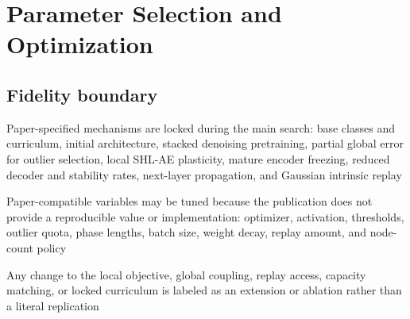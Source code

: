 \section{Parameter Selection and Optimization}

\subsection{Fidelity boundary}
\begin{draftpoints}
  \item Paper-specified mechanisms are locked during the main search: base classes and curriculum, initial architecture, stacked denoising pretraining, partial global error for outlier selection, local SHL-AE plasticity, mature encoder freezing, reduced decoder and stability rates, next-layer propagation, and Gaussian intrinsic replay
  \item Paper-compatible variables may be tuned because the publication does not provide a reproducible value or implementation: optimizer, activation, thresholds, outlier quota, phase lengths, batch size, weight decay, replay amount, and node-count policy
  \item Any change to the local objective, global coupling, replay access, capacity matching, or locked curriculum is labeled as an extension or ablation rather than a literal replication
\end{draftpoints}

